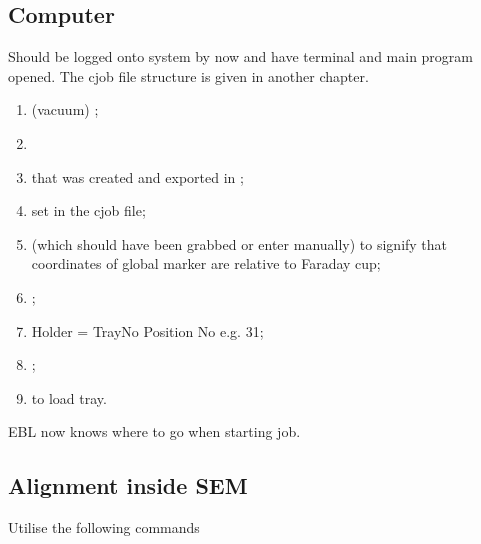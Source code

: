   \subsection{Computer}
   Should be logged onto system by now and have terminal and main program opened. The cjob file structure is given in another chapter.
   
   \begin{enumerate}
   	\item {} \ira {} (vacuum) \ira {};
   	\item {}
   	\item {} that was created and exported in ;
   	\item {} set in the cjob file;
   	\item {} (which should have been grabbed or enter manually)  to signify that coordinates of global marker are relative to Faraday cup;
   	\item {};
   	\item Holder = TrayNo Position No e.g. 31;
   	\item {};
   	\item {} to load tray.
   \end{enumerate}

   EBL now knows where to go when starting job.
 
  \subsection{Alignment inside SEM}
   Utilise the following commands
   
